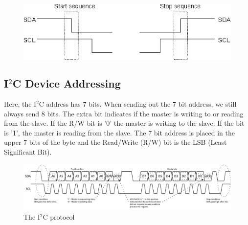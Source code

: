 \documentclass[12pt,twocolumn]{IEEEtran}
\begin{document}
  \begin{figure}[H]
    \includegraphics[width=\linewidth]{start_stop_seq.jpeg}
    \caption{}
  \end{figure}




    \subsection{I$^{2}$C Device Addressing}
	Here, the I$^{2}$C address has 7 bits. When sending out the 7 bit address, we still always send 8 bits. The extra bit indicates if the master is writing to or reading from the slave. If the R/W bit is '0' the master is writing to the slave. If the bit is '1', the master is reading from the slave. The 7 bit address is placed in the upper 7 bits of the byte and the Read/Write (R/W) bit is the LSB (Least Significant Bit).
	
    \begin{figure}[H]
	  \includegraphics[width=\textwidth]{i2c_concept.png}
	  \caption{The I$^{2}$C protocol}
     \end{figure}
\end{document}
